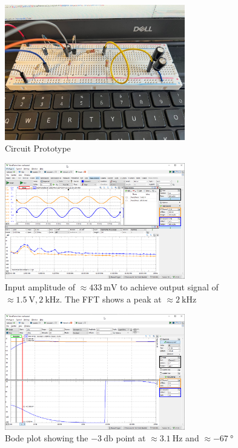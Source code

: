 \documentclass{article}
\begin{document}
	\begin{figure}[H]
	    \centering
	    \includegraphics[width=0.7\textwidth]{photo-2}
	    \caption{Circuit Prototype}
	\end{figure}
	
	\begin{figure}[H]
	    \centering
	    \includegraphics[width=0.7\textwidth]{w2a}
	    \caption{Input amplitude of $\approx \SI{433}{\milli\volt}$ to achieve output signal of $\approx \SI{1.5}{\volt}, \SI{2}{\kilo\hertz}$. The FFT shows a peak at $\approx \SI{2}{\kilo\hertz}$ }
	\end{figure}

	\begin{figure}[H]
	    \centering
	    \includegraphics[width=0.7\textwidth]{w2b}
	    \caption{Bode plot showing the $\SI{-3}{\decibel}$ point at $\approx \SI{3.1}{\hertz}$ and $\approx \SI{-67}{\degree}$}
	\end{figure}
	
\end{document}

